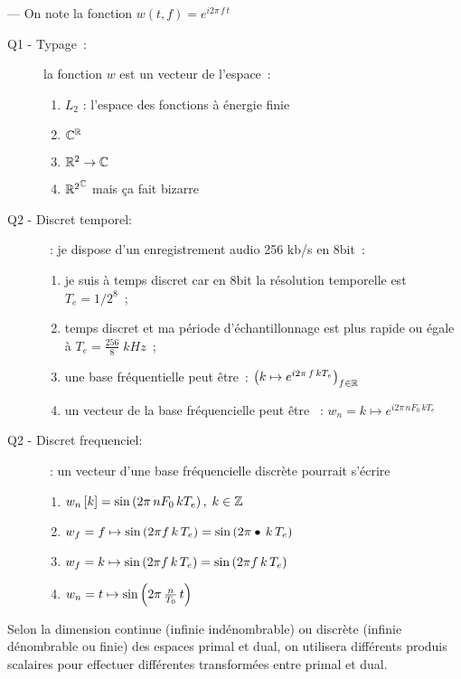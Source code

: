 \begin{quizz} ---  On note la fonction $w(t,f)=e^{i2\pi\,f\,t}$
  \begin{description}
  \item[Q1 - Typage~:] la fonction $w$ est un vecteur de l'espace~:
    \begin{enumerate}
    \item $L_2$ : l'espace des fonctions à énergie finie
    \item $\mathbb{C}^{\mathbb{R}}$
    \item $\mathbb{R}^2\to\mathbb{C}$
    \item ${\mathbb{R}^2}^{\mathbb{C}}$ mais ça fait bizarre
    \end{enumerate}
  \item[Q2 - Discret temporel:]~: je dispose d'un enregistrement audio 256 kb/s en 8bit~:
    \begin{enumerate}
    \item je suis à temps discret car en 8bit la résolution temporelle est $T_e=1/2^8$~; 
    \item temps discret et ma période d'échantillonnage est
      plus rapide ou égale à $T_e=\frac{256}{8}\; kHz$~;
    \item une base fréquentielle peut être~: $\left( k\mapsto e^{i2\pi\,f\,k T_e}\right)_{f\in\mathbb{R}}$
    \item un vecteur de la base fréquencielle peut être ~: $w_n= k\mapsto e^{i2\pi\,n F_0\, k T_e}$
    \end{enumerate} 
  \item[Q2 - Discret frequenciel:] ~: un vecteur d'une base fréquencielle discrète pourrait s'écrire
    \begin{enumerate}
    \item $w_n\left[k\right] = \sin\left(2\pi\,n F_0\,k T_e\right),\; k\in\mathbb{Z}$ 
    \item $w_f = f\mapsto\sin\left(2\pi f\,k\,T_e\right) = \sin\left(2\pi \bullet \,k\,T_e\right)$ 
    \item $w_f = k\mapsto\sin\left(2\pi f\,k\,T_e\right) = \sin\left(2\pi f \,k\,T_e\right)$ 
    \item $w_n = t\mapsto \sin\left(2\pi\, \frac{n}{T_0}\,t\right)$
    \end{enumerate}
  \end{description}
\end{quizz}


Selon la dimension continue (infinie indénombrable) ou discrète
(infinie dénombrable ou finie) des espaces primal et dual, on utilisera
différents produis scalaires pour effectuer différentes transformées
entre primal et dual.

